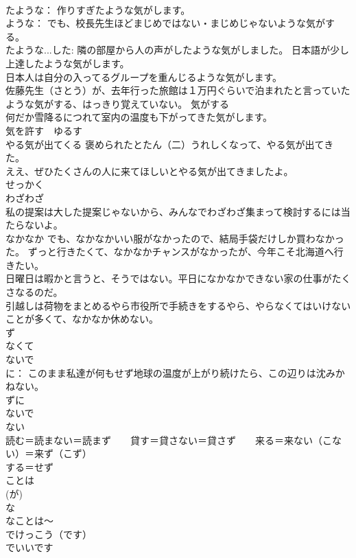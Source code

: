 \documentclass[8pt]{extreport}
\begin{document}
\begin{CJK}{UTF8}{min}
\\	たような： 作りすぎたような気がします。 
\\	ような： でも、校長先生ほどまじめではない・まじめじゃないような気がする。 
\\	たような...した: 隣の部屋から人の声がしたような気がしました。 日本語が少し上達したような気がします。 
\\	日本人は自分の入ってるグループを重んじるような気がします。 
\\	佐藤先生（さとう）が、去年行った旅館は１万円ぐらいで泊まれたと言っていたような気がする、はっきり覚えていない。 気がする 
\\	何だか雪降るにつれて室内の温度も下がってきた気がします。 
\\	気を許す　ゆるす 
\\	やる気が出てくる 褒められたとたん（二）うれしくなって、やる気が出てきた。 
\\	ええ、ぜひたくさんの人に来てほしいとやる気が出てきましたよ。 
\\	せっかく	
\\	わざわざ 
\\	私の提案は大した提案じゃないから、みんなでわざわざ集まって検討するには当たらないよ。 
\\	なかなか でも、なかなかいい服がなかったので、結局手袋だけしか買わなかった。 ずっと行きたくて、なかなかチャンスがなかったが、今年こそ北海道へ行きたい。 
\\	日曜日は暇かと言うと、そうではない。平日になかなかできない家の仕事がたくさなるのだ。 
\\	引越しは荷物をまとめるやら市役所で手続きをするやら、やらなくてはいけないことが多くて、なかなか休めない。 
\\	ず	
\\	なくて　
\\	ないで 
\\	に： このまま私達が何もせず地球の温度が上がり続けたら、この辺りは沈みかねない。 
\\	ずに 
\\	ないで 
\\	ない 
\\	読む＝読まない＝読まず　　貸す＝貸さない＝貸さず　　来る＝来ない（こない）＝来ず（こず）　
\\	する＝せず
\\	ことは
\\	(が)	
\\	な
\\	なことは～
\\	でけっこう（です）	
\\	でいいです 

\end{CJK}
\end{document}
